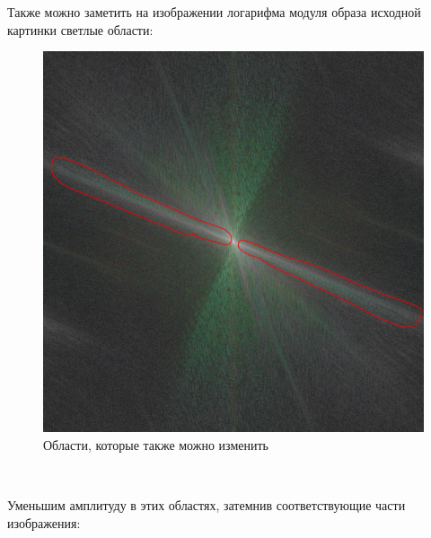 \documentclass[a4paper]{article}
\begin{document}
Также можно заметить на изображении логарифма модуля образа исходной картинки светлые области:

\begin{figure}[H]
    \centering
    \includegraphics[width=0.51\linewidth]{1/im3_fourier_highlighted.png}
    \caption{Области, которые также можно изменить}
\end{figure}\

Уменьшим амплитуду в этих областях, затемнив соответствующие части изображения:
\end{document}
